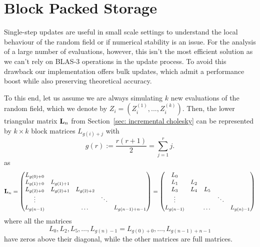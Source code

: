 \section{Block Packed Storage}\label{sec: memory layout}
Single-step updates are useful in small scale settings to understand the local
behaviour of the random field or if numerical stability is an issue. For the
analysis of a large number of evaluations, however, this isn't the most
efficient solution as we can't rely on BLAS-3 operations in the update process.
To avoid this drawback our implementation offers bulk updates, which admit a
performance boost while also preserving theoretical accuracy.

To this end, let us assume we are always simulating $k$ new evaluations of the
random field, which we denote by $Z_{i} = (Z_{i}^{(1)},...,Z_{i}^{(k)})$. Then,
the lower triangular matrix \(\mathbf{L}_n\) from Section~\ref{sec: incremental
cholesky} can be represented by \(k\times k\) block matrices \(L_{g(i)+j}\) with
\[
	g(r):= \frac{r(r+1)}2 = \sum_{j=1}^r j.
\]
as
\[
	\mathbf{L}_n = \begin{pmatrix}
		L_{g(0)+0} & \\
		L_{g(1)+0} & L_{g(1)+1} \\
		L_{g(2)+0} & L_{g(2)+1} & L_{g(2)+2} \\
		\vdots & & & \ddots \\
		L_{g(n-1)} & & \dots & & L_{g(n-1)+ n-1}
	\end{pmatrix}
	= \begin{pmatrix}
		L_{0} & \\
		L_{1} & L_{2} \\
		L_{3} & L_{4} & L_{5} \\
		\vdots & & & \ddots \\
		L_{g(n-1)} & & \dots & & L_{g(n)-1}
	\end{pmatrix}
\]
where all the matrices
\[
	L_0,L_2,L_5,\dots, L_{g(n)-1} = L_{g(0)+0}, \dots, L_{g(n-1)+n-1}
\]
have zeros above their diagonal, while the other matrices are full matrices.

